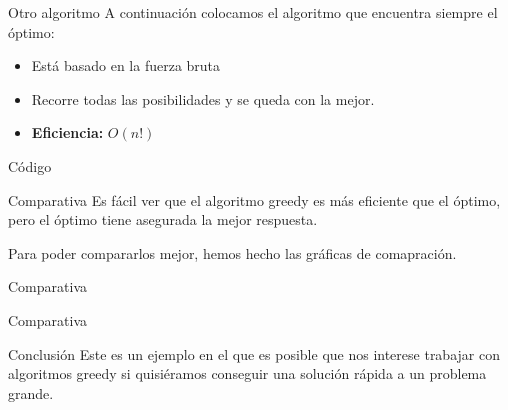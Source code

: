 \begin{frame}{Otro algoritmo}
	A continuación colocamos el algoritmo que encuentra siempre el óptimo:
	
	\begin{itemize}
		\item Está basado en la fuerza bruta
		\item Recorre todas las posibilidades y se queda con la mejor.
		\item \textbf{Eficiencia:} $O(n!)$
	\end{itemize}	
\end{frame}

\begin{frame}[fragile]{Código}
	
\end{frame}

\begin{frame}{Comparativa}
	Es fácil ver que el algoritmo greedy es más eficiente que el óptimo, pero el óptimo tiene asegurada la mejor respuesta.
	
	Para poder compararlos mejor, hemos hecho las gráficas de comapración.
\end{frame}

\begin{frame}{Comparativa}
\end{frame}

\begin{frame}{Comparativa}
\end{frame}

\begin{frame}{Conclusión}
	Este es un ejemplo en el que es posible que nos interese trabajar con algoritmos greedy si quisiéramos conseguir una solución rápida a un problema grande.
\end{frame}


